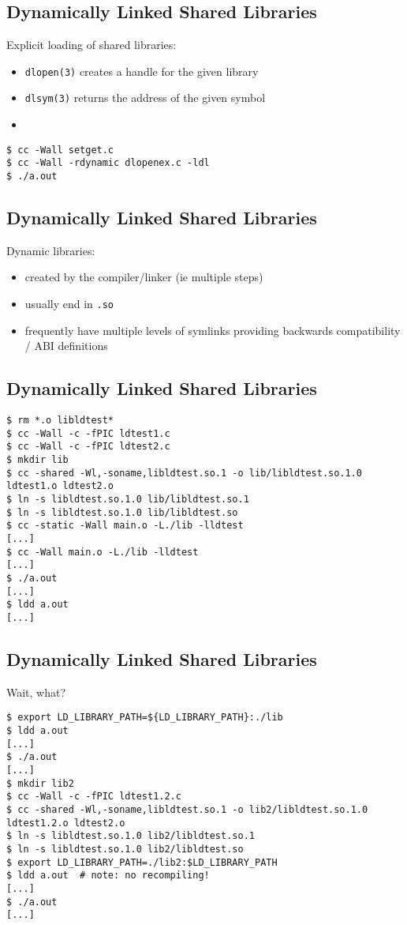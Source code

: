 \documentclass[xga]{xdvislides}
\begin{document}
\subsection{Dynamically Linked Shared Libraries}
Explicit loading of shared libraries:
\begin{itemize}
	\item {\tt dlopen(3)} creates a handle for the given library
	\item {\tt dlsym(3)} returns the address of the given symbol
	\item
\end{itemize}

\begin{verbatim}
$ cc -Wall setget.c
$ cc -Wall -rdynamic dlopenex.c -ldl
$ ./a.out
\end{verbatim}

\subsection{Dynamically Linked Shared Libraries}
Dynamic libraries:
\begin{itemize}
	\item created by the compiler/linker (ie multiple steps)
	\item usually end in {\tt .so}
	\item frequently have multiple levels of symlinks providing
		backwards compatibility / ABI definitions
\end{itemize}

\subsection{Dynamically Linked Shared Libraries}
\begin{verbatim}
$ rm *.o libldtest*
$ cc -Wall -c -fPIC ldtest1.c
$ cc -Wall -c -fPIC ldtest2.c
$ mkdir lib
$ cc -shared -Wl,-soname,libldtest.so.1 -o lib/libldtest.so.1.0 ldtest1.o ldtest2.o
$ ln -s libldtest.so.1.0 lib/libldtest.so.1
$ ln -s libldtest.so.1.0 lib/libldtest.so
$ cc -static -Wall main.o -L./lib -lldtest
[...]
$ cc -Wall main.o -L./lib -lldtest
[...]
$ ./a.out
[...]
$ ldd a.out
[...]
\end{verbatim}

\subsection{Dynamically Linked Shared Libraries}
Wait, what?
\begin{verbatim}
$ export LD_LIBRARY_PATH=${LD_LIBRARY_PATH}:./lib
$ ldd a.out
[...]
$ ./a.out
[...]
$ mkdir lib2
$ cc -Wall -c -fPIC ldtest1.2.c
$ cc -shared -Wl,-soname,libldtest.so.1 -o lib2/libldtest.so.1.0 ldtest1.2.o ldtest2.o
$ ln -s libldtest.so.1.0 lib2/libldtest.so.1
$ ln -s libldtest.so.1.0 lib2/libldtest.so
$ export LD_LIBRARY_PATH=./lib2:$LD_LIBRARY_PATH
$ ldd a.out  # note: no recompiling!
[...]
$ ./a.out
[...]
\end{verbatim}
\end{document}
